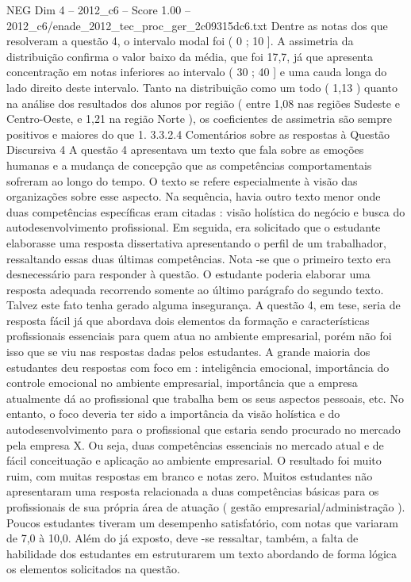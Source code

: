 \begin{textsample}{NEG Dim 4 – 2012\_c6 – Score 1.00 – 2012\_c6/enade\_2012\_tec\_proc\_ger\_2c09315dc6.txt}
Dentre as notas dos que resolveram a questão 4, o intervalo modal foi ( 0 ; 10 ].
A assimetria da distribuição confirma o valor baixo da média, que foi 17,7, já que apresenta concentração em notas inferiores ao intervalo ( 30 ; 40 ] e uma cauda longa do lado direito deste intervalo.
Tanto na distribuição como um todo ( 1,13 ) quanto na análise dos resultados dos alunos por região ( entre 1,08 nas regiões Sudeste e Centro-Oeste, e 1,21 na região Norte ), os coeficientes de assimetria são sempre positivos e maiores do que 1. 3.3.2.4 Comentários sobre as respostas à Questão Discursiva 4 A questão 4 apresentava um texto que fala sobre as emoções humanas e a mudança de concepção que as competências comportamentais sofreram ao longo do tempo.
O texto se refere especialmente à visão das organizações sobre esse aspecto.
Na sequência, havia outro texto menor onde duas competências específicas eram citadas : visão holística do negócio e busca do autodesenvolvimento profissional.
Em seguida, era solicitado que o estudante elaborasse uma resposta dissertativa apresentando o perfil de um trabalhador, ressaltando essas duas últimas competências.
Nota -se que o primeiro texto era desnecessário para responder à questão.
O estudante poderia elaborar uma resposta adequada recorrendo somente ao último parágrafo do segundo texto.
Talvez este fato tenha gerado alguma insegurança.
A questão 4, em tese, seria de resposta fácil já que abordava dois elementos da formação e características profissionais essenciais para quem atua no ambiente empresarial, porém não foi isso que se viu nas respostas dadas pelos estudantes.
A grande maioria dos estudantes deu respostas com foco em : inteligência emocional, importância do controle emocional no ambiente empresarial, importância que a empresa atualmente dá ao profissional que trabalha bem os seus aspectos pessoais, etc.
No entanto, o foco deveria ter sido a importância da visão holística e do autodesenvolvimento para o profissional que estaria sendo procurado no mercado pela empresa X.
Ou seja, duas competências essenciais no mercado atual e de fácil conceituação e aplicação ao ambiente empresarial.
O resultado foi muito ruim, com muitas respostas em branco e notas zero.
Muitos estudantes não apresentaram uma resposta relacionada a duas competências básicas para os profissionais de sua própria área de atuação ( gestão empresarial/administração ).
Poucos estudantes tiveram um desempenho satisfatório, com notas que variaram de 7,0 à 10,0.
Além do já exposto, deve -se ressaltar, também, a falta de habilidade dos estudantes em estruturarem um texto abordando de forma lógica os elementos solicitados na questão.

\end{textsample}
